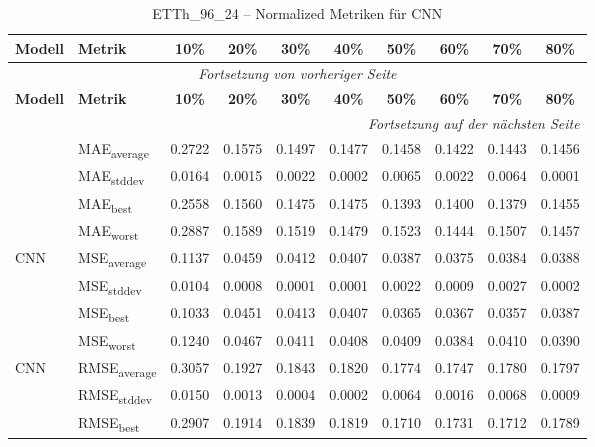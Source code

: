 {\small
\begin{longtable}{l l c c c c c c c c}
    \toprule
    \textbf{Modell} & \textbf{Metrik} & \textbf{10\%} & \textbf{20\%} & \textbf{30\%} & \textbf{40\%} & \textbf{50\%} & \textbf{60\%} & \textbf{70\%} & \textbf{80\%} \\
    \midrule
    \endfirsthead
    \multicolumn{10}{c}{\textit{Fortsetzung von vorheriger Seite}} \\
    \toprule
    \textbf{Modell} & \textbf{Metrik} & \textbf{10\%} & \textbf{20\%} & \textbf{30\%} & \textbf{40\%} & \textbf{50\%} & \textbf{60\%} & \textbf{70\%} & \textbf{80\%} \\
    \midrule
    \endhead
    \midrule
    \multicolumn{10}{r}{\textit{Fortsetzung auf der nächsten Seite}} \\
    \midrule
    \endfoot
    \bottomrule
    \caption{ETTh_96_24 -- Normalized Metriken für CNN}
    \label{tab:etth_96_24_normalized_cnn}
    \endlastfoot
\multirow{4}{*}{CNN} & MAE\textsubscript{average} & 0.2722 & 0.1575 & 0.1497 & 0.1477 & 0.1458 & 0.1422 & 0.1443 & 0.1456 \\
 & MAE\textsubscript{stddev} & 0.0164 & 0.0015 & 0.0022 & 0.0002 & 0.0065 & 0.0022 & 0.0064 & 0.0001 \\
 & MAE\textsubscript{best} & 0.2558 & 0.1560 & 0.1475 & 0.1475 & 0.1393 & 0.1400 & 0.1379 & 0.1455 \\
 & MAE\textsubscript{worst} & 0.2887 & 0.1589 & 0.1519 & 0.1479 & 0.1523 & 0.1444 & 0.1507 & 0.1457 \\
\cmidrule(lr){2-10}
\multirow{4}{*}{CNN} & MSE\textsubscript{average} & 0.1137 & 0.0459 & 0.0412 & 0.0407 & 0.0387 & 0.0375 & 0.0384 & 0.0388 \\
 & MSE\textsubscript{stddev} & 0.0104 & 0.0008 & 0.0001 & 0.0001 & 0.0022 & 0.0009 & 0.0027 & 0.0002 \\
 & MSE\textsubscript{best} & 0.1033 & 0.0451 & 0.0413 & 0.0407 & 0.0365 & 0.0367 & 0.0357 & 0.0387 \\
 & MSE\textsubscript{worst} & 0.1240 & 0.0467 & 0.0411 & 0.0408 & 0.0409 & 0.0384 & 0.0410 & 0.0390 \\
\cmidrule(lr){2-10}
\multirow{4}{*}{CNN} & RMSE\textsubscript{average} & 0.3057 & 0.1927 & 0.1843 & 0.1820 & 0.1774 & 0.1747 & 0.1780 & 0.1797 \\
 & RMSE\textsubscript{stddev} & 0.0150 & 0.0013 & 0.0004 & 0.0002 & 0.0064 & 0.0016 & 0.0068 & 0.0009 \\
 & RMSE\textsubscript{best} & 0.2907 & 0.1914 & 0.1839 & 0.1819 & 0.1710 & 0.1731 & 0.1712 & 0.1789 \\

\end{longtable}}
